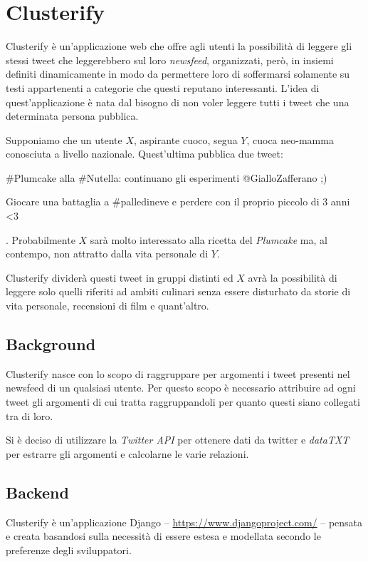 \chapter{Clusterify}
	Clusterify è un'applicazione web che offre agli utenti la possibilità di leggere gli stessi tweet che leggerebbero sul loro \emph{newsfeed}, organizzati, però, in insiemi definiti dinamicamente in modo da permettere loro di soffermarsi solamente su testi appartenenti a categorie che questi reputano interessanti. L'idea di quest'applicazione è nata dal bisogno di non voler leggere tutti i tweet che una determinata persona pubblica. 

	Supponiamo che un utente $X$, aspirante cuoco, segua $Y$, cuoca neo-mamma conosciuta a livello nazionale. Quest'ultima pubblica due tweet:
	\begin{inparaenum}[\itshape 1\upshape)]
		\item \#Plumcake alla \#Nutella: continuano gli esperimenti @GialloZafferano ;)
		\item Giocare una battaglia a \#palledineve e perdere con il proprio piccolo di 3 anni <3
	\end{inparaenum}.
	Probabilmente $X$ sarà molto interessato alla ricetta del \emph{Plumcake} ma, al contempo, non attratto dalla vita personale di $Y$.

	Clusterify dividerà questi tweet in gruppi distinti ed $X$ avrà la possibilità di leggere solo quelli riferiti ad ambiti culinari senza essere disturbato da storie di vita personale, recensioni di film e quant'altro.

\section{Background}
	Clusterify nasce con lo scopo di raggruppare per argomenti i tweet presenti nel newsfeed di un qualsiasi utente. Per questo scopo è necessario attribuire ad ogni tweet gli argomenti di cui tratta raggruppandoli per quanto questi siano collegati tra di loro. 

	Si è deciso di utilizzare la \emph{Twitter API} per ottenere dati da twitter e \emph{dataTXT} per estrarre gli argomenti e calcolarne le varie relazioni.

	
	

\section{Backend}
	Clusterify è un'applicazione Django -- \url{https://www.djangoproject.com/} -- pensata e creata basandosi sulla necessità di essere estesa e modellata secondo le preferenze degli sviluppatori. %

